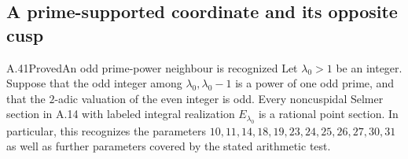 \subsection{A prime-supported coordinate and its opposite cusp}

\begin{statement}{A.41}{Proved}{An odd prime-power neighbour is recognized}
Let $\lambda_0>1$ be an integer.  Suppose that the odd integer among
$\lambda_0,\lambda_0-1$ is a power of one odd prime, and that the
$2$-adic valuation of the even integer is odd.  Every noncuspidal
Selmer section in A.14 with labeled integral realization
$E_{\lambda_0}$ is a rational point section.
In particular, this recognizes the parameters $10,11,14,18,19,23,
24,25,26,27,30,31$ as well as further parameters covered by the
stated arithmetic test.
\end{statement}
